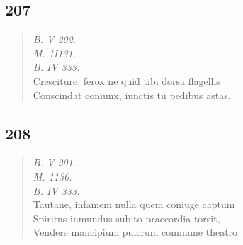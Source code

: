 \documentclass[11pt, a4paper]{report}
\begin{document}
            \subsection*{207}
      \begin{verse}
      \textit{B. V 202.} \\ \textit{M. 1I131.} \\ \textit{B. IV 333.} \\ Cresciture, ferox ne quid tibi dorsa flagellis \\ Conscindat coniunx, iunctis tu pedibus astas. \\ 
      \end{verse}
  
            \subsection*{208}
      \begin{verse}
      \textit{B. V 201.} \\ \textit{M. 1130.} \\ \textit{B. IV 333.} \\ Tautane, infamem nulla quem coniuge captum \\ Spiritus inmundus subito praecordia torsit, \\ Vendere mancipium pulcrum commune theatro \\ 
      \end{verse}
  
\end{document}
